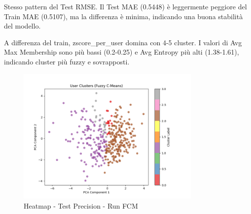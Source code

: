 Stesso pattern del Test RMSE. Il Test MAE (0.5448) è leggermente peggiore del Train MAE (0.5107), ma la differenza è minima, indicando una buona stabilità del modello.

\begin{table}[H]
  \centering
  \caption{Top 5 Configurazioni per Test Precision - Run FCM}
\end{table}

A differenza del train, zscore\_per\_user domina con 4-5 cluster. I valori di Avg Max Membership sono più bassi (0.2-0.25) e Avg Entropy più alti (1.38-1.61), indicando cluster più fuzzy e sovrapposti.

\begin{figure}[H]
  \centering
  \includegraphics[width=0.8\textwidth]{../output/run_fcm/images/normalization/zscore_per_user/fuzzy_clusters/fuzzy_clusters_pca_c4_m2.2_fcm_maximum_pearson.png}
  \caption{Heatmap - Test Precision - Run FCM}
  \label{fig:test_precision_fcm}
\end{figure}

